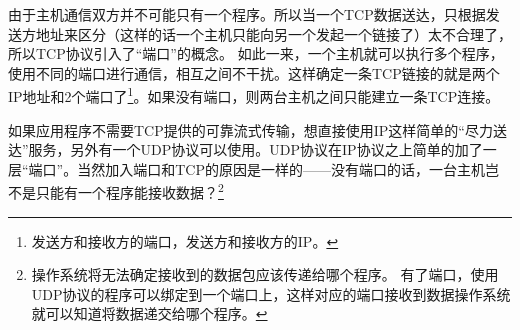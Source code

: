 由于主机通信双方并不可能只有一个程序。所以当一个TCP数据送达，只根据发送方地址来区分（这样的话一个主机只能向另一个发起一个链接了）太不合理了，所以TCP协议引入了“端口”的概念。
如此一来，一个主机就可以执行多个程序，使用不同的端口进行通信，相互之间不干扰。这样确定一条TCP链接的就是两个IP地址和2个端口了\footnote{发送方和接收方的端口，发送方和接收方的IP。}。如果没有端口，则两台主机之间只能建立一条TCP连接。

如果应用程序不需要TCP提供的可靠流式传输，想直接使用IP这样简单的“尽力送达”服务，另外有一个UDP协议可以使用。UDP协议在IP协议之上简单的加了一层“端口”。当然加入端口和TCP的原因是一样的——没有端口的话，一台主机岂不是只能有一个程序能接收数据？\footnote{操作系统将无法确定接收到的数据包应该传递给哪个程序。
有了端口，使用UDP协议的程序可以绑定到一个端口上，这样对应的端口接收到数据操作系统就可以知道将数据递交给哪个程序。}


